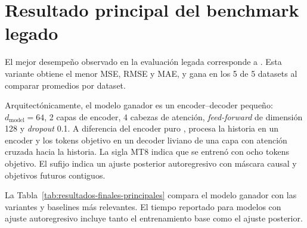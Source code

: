 \section{Resultado principal del benchmark legado}
\label{sec:resultado-principal-final}

El mejor desempeño observado en la evaluación legada corresponde a . Esta variante obtiene el menor MSE, RMSE y MAE, y gana en los 5 de 5 datasets al comparar promedios por dataset.

\hfill

Arquitectónicamente, el modelo ganador es un encoder--decoder pequeño: $d_{\text{model}}=64$, 2 capas de encoder, 4 cabezas de atención, \emph{feed-forward} de dimensión 128 y \emph{dropout} 0.1. A diferencia del encoder puro \CTTransformer, procesa la historia en un encoder y los tokens objetivo en un decoder liviano de una capa con atención cruzada hacia la historia. La sigla MT8 indica que se entrenó con ocho tokens objetivo. El sufijo  indica un ajuste posterior autoregresivo con máscara causal y objetivos futuros contiguos.

\hfill

La Tabla~\ref{tab:resultados-finales-principales} compara el modelo ganador con las variantes y baselines más relevantes. El tiempo reportado para modelos con ajuste autoregresivo incluye tanto el entrenamiento base como el ajuste posterior.

\begin{table}[H]
	\centering
	\caption{Medias descriptivas de modelos representativos en el benchmark legado.}
	\label{tab:resultados-finales-principales}
	\scriptsize
\end{table}

